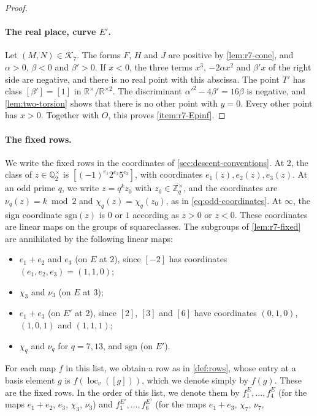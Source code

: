 \documentclass[12pt,oneside,openany]{book}
\theoremstyle{definition}
\theoremstyle{plain}
\numberwithin{equation}{chapter}
\theoremstyle{plain}
\theoremstyle{definition}
\theoremstyle{remark}
\newcommand{\Q}{\mathbb Q}
\newcommand{\Z}{\mathbb Z}
\newcommand{\R}{\mathbb R}
\newcommand{\sq}[1]{[#1]}
\newcommand{\sqgp}[1]{#1^{\times}/#1^{\times2}}
\newcommand{\cK}{\mathcal K}
\begin{document}
\begin{proof}
\paragraph{The real place, curve $E'$.}
Let $(M,N)\in\cK_7$. The forms $F$, $H$ and $J$ are positive by
\cref{lem:r7-cone}, and $\alpha>0$, $\beta<0$ and $\beta'>0$. If $x<0$, the three terms
$x^3$, $-2\alpha x^2$ and $\beta'x$ of the right side are negative, and
there is no real point with this abscissa. The point $T'$ has class
$\sq{\beta'}=\sq1$ in $\sqgp{\R}$. The discriminant $\alpha'^2-4\beta'=16\beta$
is negative, and \cref{lem:two-torsion} shows that there is no other point
with $y=0$. Every
other point has $x>0$. Together with $O$, this proves \ref{item:r7-Epinf}.
\end{proof}

\paragraph{The fixed rows.}
We write the fixed rows in the coordinates of
\cref{sec:descent-conventions}. At $2$, the class of $z\in\Q_2^\times$ is
$\sq{(-1)^{e_1}2^{e_2}5^{e_3}}$, with coordinates $e_1(z),e_2(z),e_3(z)$.
At an odd prime $q$, we write $z=q^kz_0$ with $z_0\in\Z_q^\times$, and the
coordinates are $\nu_q(z)=k\bmod2$ and $\chi_q(z)=\chi_q(z_0)$, as in
\eqref{eq:odd-coordinates}. At $\infty$, the sign coordinate
$\mathrm{sgn}(z)$ is $0$ or $1$ according as $z>0$ or $z<0$. These coordinates are linear maps on the groups of
squareclasses. The subgroups of \cref{lem:r7-fixed} are annihilated by the
following linear maps:
\begin{itemize}
\item $e_1+e_2$ and $e_3$ (on $E$ at $2$), since $\sq{-2}$ has coordinates
$(e_1,e_2,e_3)=(1,1,0)$;
\item $\chi_3$ and $\nu_3$ (on $E$ at $3$);
\item $e_1+e_3$ (on $E'$ at $2$), since $\sq2$, $\sq3$ and $\sq6$ have
coordinates $(0,1,0)$, $(1,0,1)$ and $(1,1,1)$;
\item $\chi_q$ and $\nu_q$ for $q=7,13$, and $\mathrm{sgn}$ (on $E'$).
\end{itemize}
For each map $f$ in this list, we obtain a row as in \cref{def:rows}, whose
entry at a basis element $g$ is $f(\operatorname{loc}_v(\sq g))$, which we
denote simply by $f(g)$. These are the fixed rows. In the order of this list, we denote them by
$f^E_1,\dots,f^E_4$ (for the maps $e_1+e_2$, $e_3$, $\chi_3$, $\nu_3$) and
$f^{E'}_1,\dots,f^{E'}_6$ (for the maps $e_1+e_3$, $\chi_7$, $\nu_7$,
\end{document}
